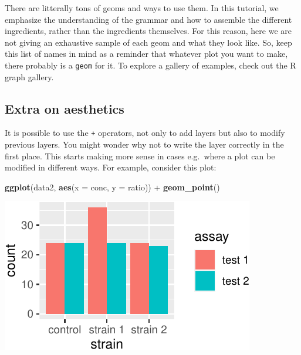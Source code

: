 \documentclass[]{book}
\newenvironment{Shaded}{}{}
\newcommand{\DataTypeTok}[1]{\textcolor[rgb]{0.56,0.13,0.00}{#1}}
\newcommand{\KeywordTok}[1]{\textcolor[rgb]{0.00,0.44,0.13}{\textbf{#1}}}
\newcommand{\NormalTok}[1]{#1}
\newcommand{\OperatorTok}[1]{\textcolor[rgb]{0.40,0.40,0.40}{#1}}
\newcommand{\StringTok}[1]{\textcolor[rgb]{0.25,0.44,0.63}{#1}}
\begin{document}
There are litterally tons of geoms and ways to use them. In this tutorial, we emphasize the understanding of the grammar and how to assemble the different ingredients, rather than the ingredients themselves. For this reason, here we are not giving an exhaustive sample of each geom and what they look like. So, keep this list of names in mind as a reminder that whatever plot you want to make, there probably is a \texttt{geom} for it. To explore a gallery of examples, check out the R graph gallery.

\hypertarget{extra-on-aesthetics}{%
\subsection{Extra on aesthetics}\label{extra-on-aesthetics}}

It is possible to use the \texttt{+} operators, not only to add layers but also to modify previous layers. You might wonder why not to write the layer correctly in the first place. This starts making more sense in cases e.g.~where a plot can be modified in different ways. For example, consider this plot:

\begin{Shaded}
\begin{Highlighting}[]
\KeywordTok{ggplot}\NormalTok{(data2, }\KeywordTok{aes}\NormalTok{(}\DataTypeTok{x =}\NormalTok{ conc, }\DataTypeTok{y =}\NormalTok{ ratio)) }\OperatorTok{+}
\StringTok{  }\KeywordTok{geom_point}\NormalTok{()}
\end{Highlighting}
\end{Shaded}

\begin{center}\includegraphics[width=\textwidth]{TRES-Tidy-Tutorial_files/figure-latex/unnamed-chunk-118-1} \end{center}
\end{document}
